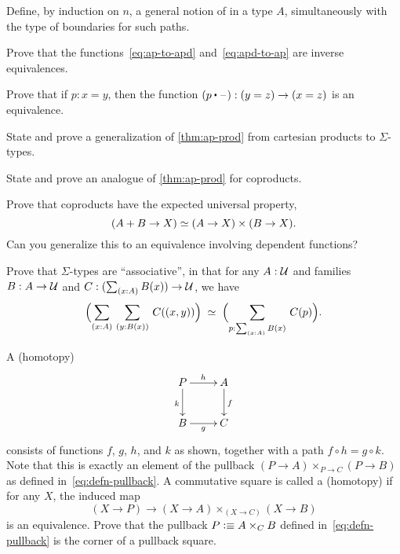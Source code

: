 \begin{ex}\label{ex:npaths}
  Define, by induction on $n$, a general notion of  in a type $A$, simultaneously with the type of boundaries for such paths.
\end{ex}

\begin{ex}\label{ex:ap-to-apd-equiv-apd-to-ap}
  Prove that the functions~\eqref{eq:ap-to-apd} and~\eqref{eq:apd-to-ap} are inverse equivalences.
\end{ex}

\begin{ex}\label{ex:equiv-concat}
  Prove that if $p:x=y$, then the function $(p\ct \blank):(y=z) \to (x=z)$ is an equivalence.
\end{ex}

\begin{ex}\label{ex:ap-sigma}
  State and prove a generalization of \cref{thm:ap-prod} from cartesian products to $\Sigma$-types.
\end{ex}

\begin{ex}\label{ex:ap-coprod}
  State and prove an analogue of \cref{thm:ap-prod} for coproducts.
\end{ex}

\begin{ex}\label{ex:coprod-ump}
  Prove that coproducts have the expected universal property,
  \[ (A+B \to X) \simeq (A\to X)\times (B\to X). \]
  Can you generalize this to an equivalence involving dependent functions?
\end{ex}

\begin{ex}\label{ex:sigma-assoc}
  Prove that $\Sigma$-types are ``associative'',
  in that for any $A:\mathcal{U}$ and families $B:A\to\mathcal{U}$ and $C:(\sm{x:A} B(x))\to\UU$, we have
  \[\eqvspaced{\Parens{\sm{x:A}{y:B(x)} C(\pairr{x,y})}}{\Parens{\sm{p:\sm{x:A}B(x)} C(p)}}. \]
\end{ex}

\begin{ex}\label{ex:pullback}
  A (homotopy) 
  \begin{equation*}
  \vcenter{\xymatrix{
      P\ar[r]^h\ar[d]_k &
      A\ar[d]^f\\
      B\ar[r]_g &
      C
      }}
  \end{equation*}
  consists of functions $f$, $g$, $h$, and $k$ as shown, together with a path $f \circ h= g \circ k$.
  Note that this is exactly an element of the pullback $(P\to A) \times_{P\to C} (P\to B)$ as defined in~\eqref{eq:defn-pullback}.
  A commutative square is called a (homotopy) 
  if for any $X$, the induced map
  \[ (X\to P) \to (X\to A) \times_{(X\to C)} (X\to B) \]
  is an equivalence.
  Prove that the pullback $P \vcentcolon\equiv A\times_C B$ defined in~\eqref{eq:defn-pullback} is the corner of a pullback square.
\end{ex}

